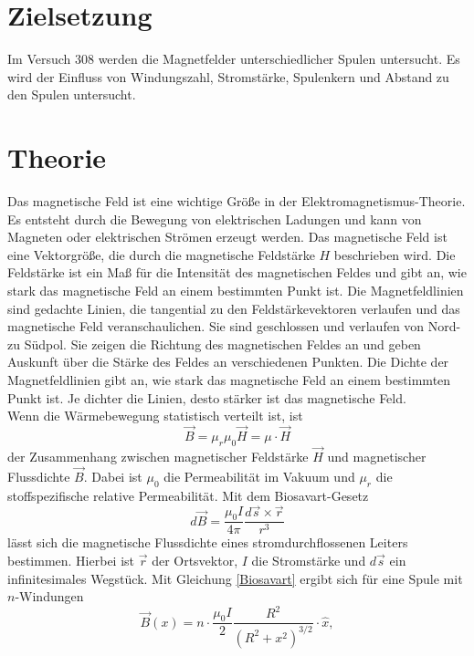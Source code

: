 \section{Zielsetzung}
\label{sec:Zielsetzung}

Im Versuch 308 werden die Magnetfelder unterschiedlicher Spulen untersucht. Es wird der Einfluss von Windungszahl, 
Stromstärke, Spulenkern und Abstand zu den Spulen untersucht.\\

\section{Theorie}
\label{sec:Theorie}
Das magnetische Feld ist eine wichtige Größe in der Elektromagnetismus-Theorie. 
Es entsteht durch die Bewegung von elektrischen Ladungen und kann von Magneten oder elektrischen Strömen erzeugt werden.
Das magnetische Feld ist eine Vektorgröße, die durch die magnetische Feldstärke $H$ beschrieben wird. 
Die Feldstärke ist ein Maß für die Intensität des magnetischen Feldes und gibt an, wie stark das magnetische Feld an einem bestimmten Punkt ist. 
Die Magnetfeldlinien sind gedachte Linien, die tangential zu den Feldstärkevektoren verlaufen und das magnetische Feld veranschaulichen. 
Sie sind geschlossen und verlaufen von Nord- zu Südpol. Sie zeigen die Richtung des magnetischen Feldes an und geben Auskunft über die Stärke des Feldes an verschiedenen Punkten. 
Die Dichte der Magnetfeldlinien gibt an, wie stark das magnetische Feld an einem bestimmten Punkt ist. Je dichter die Linien, desto stärker ist das magnetische Feld.
\\
Wenn die Wärmebewegung statistisch verteilt ist, ist
\begin{equation*}
    \vec{B} = \mu_r \mu_0 \vec{H} = μ \cdot \vec{H}
\end{equation*}
der Zusammenhang zwischen magnetischer Feldstärke $\vec{H}$ und magnetischer Flussdichte $\vec{B}$. Dabei ist $\mu_0$ die Permeabilität im Vakuum und $\mu_r$ die
stoffspezifische relative Permeabilität.
Mit dem Biosavart-Gesetz 
\begin{equation}\label{Biosavart}
    d\vec{B} = \frac{μ_0I}{4π} \frac{d\vec{s} \times \vec{r}}{r^3}
\end{equation}
lässt sich die magnetische Flussdichte eines stromdurchflossenen Leiters bestimmen. Hierbei ist $\vec{r}$ der Ortsvektor, $I$ die Stromstärke und $d\vec{s}$ ein 
infinitesimales Wegstück. 
Mit Gleichung \eqref{Biosavart} ergibt sich für eine Spule mit $n$-Windungen 
\begin{equation*}
    \vec{B}(x) = n \cdot \frac{μ_0I}{2} \frac{R^2}{(R^2 + x^2)^{3/2}} \cdot \hat{x},
\end{equation*}
